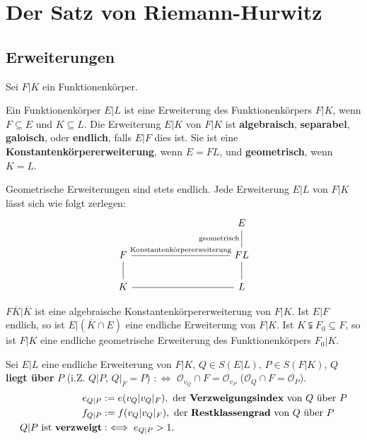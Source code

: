 \chapter{Der Satz von Riemann-Hurwitz}

\section{Erweiterungen}
Sei $F|K$ ein Funktionenkörper.

\begin{definition}
    Ein Funktionenkörper $E|L$ ist eine Erweiterung des Funktionenkörpers $F|K$, wenn $F \subseteq E$ und $K \subseteq L$.
    Die Erweiterung $E|K$ von $F|K$ ist \textbf{algebraisch}, \textbf{separabel}, \textbf{galoisch}, oder \textbf{endlich}, falls
    $E|F$ dies ist. Sie ist eine \textbf{Konstantenkörpererweiterung}, wenn $E = FL$, und \textbf{geometrisch}, wenn $K=L$.
\end{definition}

\begin{bemerkungnr}
    Geometrische Erweiterungen sind stets endlich. Jede Erweiterung $E|L$ von $F|K$ lässt sich wie folgt zerlegen:
    $$\begin{tikzcd}[column sep=10em]
          & E\\
        F \rar[dash]{\text{Konstantenkörpererweiterung}} & FL \uar[dash]{\text{geometrisch}}\\
        K \rar[dash] \uar[dash] & L \uar[dash]
    \end{tikzcd}$$
\end{bemerkungnr}

\begin{beispiel}
    $F\overline{K}|\overline{K}$ ist eine algebraische Konstantenkörpererweiterung von $F|K$.
    Ist $E|F$ endlich, so ist $E|(\overline{K}\cap E)$ eine endliche Erweiterung von $F|K$.
    Ist $K \subsetneqq F_0 \subseteq F$, so ist $F|K$ eine endliche geometrische Erweiterung des Funktionenkörpers $F_0|K$.
\end{beispiel}

\begin{definition}
    Sei $E|L$ eine endliche Erweiterung von $F|K$, $Q \in S(E|L)$, $P \in S(F|K)$, $Q$ \textbf{liegt über} $P$ 
    (i.Z. $Q|P$, $Q|_F = P$) $: \iff$ $\mathcal{O}_{v_Q} \cap F = \mathcal{O}_{v_P}$ ($\mathcal{O}_Q \cap F = \mathcal{O}_P$).
    \begin{align*}
        e_{Q|P} & := e(v_Q | v_Q|_F), \text{ der \textbf{Verzweigungsindex} von } Q \text{ über } P\\
        f_{Q|P} & := f(v_Q | v_Q|_F), \text{ der \textbf{Restklassengrad} von } Q \text{ über } P\\
        Q|P \text{ ist \textbf{verzweigt}} & :\iff e_{Q|P} > 1.
    \end{align*}
\end{definition}

